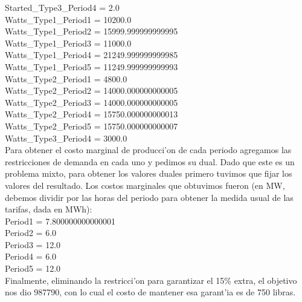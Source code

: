 Started\_Type3\_Period4 = 2.0\\
Watts\_Type1\_Period1 = 10200.0\\
Watts\_Type1\_Period2 = 15999.999999999995\\
Watts\_Type1\_Period3 = 11000.0\\
Watts\_Type1\_Period4 = 21249.999999999985\\
Watts\_Type1\_Period5 = 11249.999999999993\\
Watts\_Type2\_Period1 = 4800.0\\
Watts\_Type2\_Period2 = 14000.000000000005\\
Watts\_Type2\_Period3 = 14000.000000000005\\
Watts\_Type2\_Period4 = 15750.000000000013\\
Watts\_Type2\_Period5 = 15750.000000000007\\
Watts\_Type3\_Period4 = 3000.0\\
Para obtener el costo marginal de producci'on de cada periodo agregamos las restricciones de demanda en cada uno y pedimos su dual. Dado que este es un problema mixto, para obtener los valores duales primero tuvimos que fijar los valores del resultado. Los costos marginales que obtuvimos fueron (en MW, debemos dividir por las horas del periodo para obtener la medida usual de las tarifas, dada en MWh): \\
Period1 = 7.800000000000001\\
Period2 = 6.0\\
Period3 = 12.0\\
Period4 = 6.0\\
Period5 = 12.0\\
Finalmente, eliminando la restricci'on para garantizar el 15\% extra, el objetivo nos dio 987790, con lo cual el costo de mantener esa garant'ia es de 750 libras.